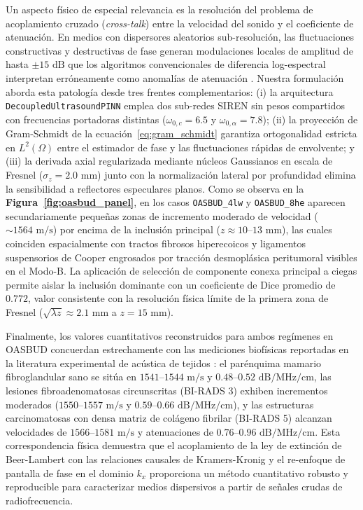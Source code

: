 \documentclass[9pt]{article}
\begin{document}
Un aspecto físico de especial relevancia es la resolución del problema de acoplamiento cruzado (\textit{cross-talk}) entre la velocidad del sonido y el coeficiente de atenuación. En medios con dispersores aleatorios sub-resolución, las fluctuaciones constructivas y destructivas de fase generan modulaciones locales de amplitud de hasta $\pm 15\text{ dB}$ que los algoritmos convencionales de diferencia log-espectral interpretan erróneamente como anomalías de atenuación \parencite{Kim2008, Coila2018}. Nuestra formulación aborda esta patología desde tres frentes complementarios: (i) la arquitectura \texttt{DecoupledUltrasoundPINN} emplea dos sub-redes SIREN sin pesos compartidos con frecuencias portadoras distintas ($\omega_{0,c}=6.5$ y $\omega_{0,\alpha}=7.8$); (ii) la proyección de Gram-Schmidt de la ecuación~\eqref{eq:gram_schmidt} garantiza ortogonalidad estricta en $L^2(\Omega)$ entre el estimador de fase y las fluctuaciones rápidas de envolvente; y (iii) la derivada axial regularizada mediante núcleos Gaussianos en escala de Fresnel ($\sigma_z = 2.0\text{ mm}$) junto con la normalización lateral por profundidad elimina la sensibilidad a reflectores especulares planos. Como se observa en la \textbf{Figura~\ref{fig:oasbud_panel}}, en los casos \texttt{OASBUD\_4lw} y \texttt{OASBUD\_8he} aparecen secundariamente pequeñas zonas de incremento moderado de velocidad ($\sim 1564\text{ m/s}$) por encima de la inclusión principal ($z \approx 10\text{--}13\text{ mm}$), las cuales coinciden espacialmente con tractos fibrosos hiperecoicos y ligamentos suspensorios de Cooper engrosados por tracción desmoplásica peritumoral visibles en el Modo-B. La aplicación de selección de componente conexa principal a ciegas permite aislar la inclusión dominante con un coeficiente de Dice promedio de $0.772$, valor consistente con la resolución física límite de la primera zona de Fresnel ($\sqrt{\lambda z} \approx 2.1\text{ mm}$ a $z = 15\text{ mm}$).

Finalmente, los valores cuantitativos reconstruidos para ambos regímenes en OASBUD concuerdan estrechamente con las mediciones biofísicas reportadas en la literatura experimental de acústica de tejidos \parencite{Duck1990, Szabo2014, Piotrzkowska2017}: el parénquima mamario fibroglandular sano se sitúa en $1541\text{--}1544\text{ m/s}$ y $0.48\text{--}0.52\text{ dB/MHz/cm}$, las lesiones fibroadenomatosas circunscritas (BI-RADS 3) exhiben incrementos moderados ($1550\text{--}1557\text{ m/s}$ y $0.59\text{--}0.66\text{ dB/MHz/cm}$), y las estructuras carcinomatosas con densa matriz de colágeno fibrilar (BI-RADS 5) alcanzan velocidades de $1566\text{--}1581\text{ m/s}$ y atenuaciones de $0.76\text{--}0.96\text{ dB/MHz/cm}$. Esta correspondencia física demuestra que el acoplamiento de la ley de extinción de Beer-Lambert con las relaciones causales de Kramers-Kronig y el re-enfoque de pantalla de fase en el dominio $k_x$ proporciona un método cuantitativo robusto y reproducible para caracterizar medios dispersivos a partir de señales crudas de radiofrecuencia.
\end{document}
